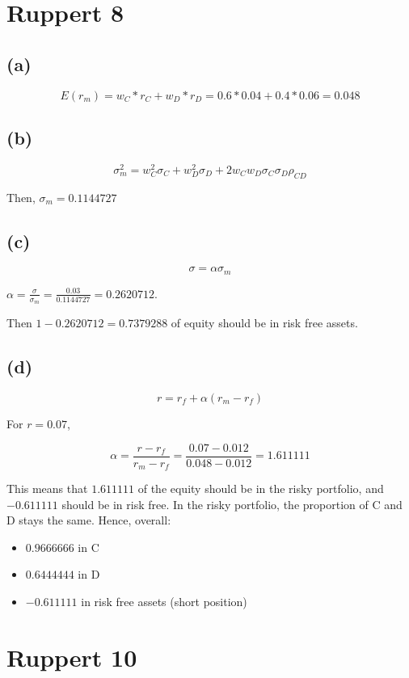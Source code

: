 \documentclass[11pt]{scrartcl}
\begin{document}
\section*{Ruppert 8}

\subsection*{(a)}

\[E(r_m) = w_C * r_C + w_D * r_D =  0.6*0.04 + 0.4 * 0.06 =0.048\]

\subsection*{(b)}

\[\sigma_{m}^2 = w^2_C\sigma_C + w^2_D\sigma_D + 2w_C w_D \sigma_C \sigma_D \rho_{CD}\]

Then, $\sigma_m = 0.1144727$

\subsection*{(c)}

\[\sigma = \alpha\sigma_m\]

$\alpha = \frac{\sigma}{\sigma_m} = \frac{0.03}{0.1144727} = 0.2620712$. 

Then $1-0.2620712 = 0.7379288$ of equity should be in risk free assets.

\subsection*{(d)}

\[r = r_f + \alpha(r_m - r_f)\]

For $r=0.07$,

\[\alpha = \frac{r-r_f}{r_m - r_f} = \frac{0.07-0.012}{0.048-0.012} = 1.611111\]

This means that $1.611111$ of the equity should be in the risky portfolio, and $-0.611111$ should be in risk free. In the risky portfolio, the proportion of C and D stays the same. Hence, overall:

\begin{itemize}
\item $0.9666666$ in C
\item $0.6444444$ in D
\item $-0.611111$ in risk free assets (short position)
\end{itemize}

\section*{Ruppert 10}
\end{document}
